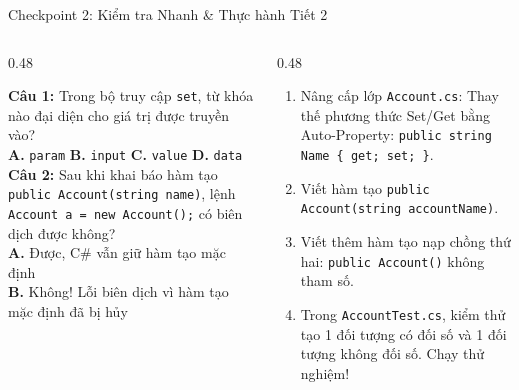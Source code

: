 \documentclass[aspectratio=169, 10pt]{beamer}
\begin{document}
\begin{frame}{Checkpoint 2: Kiểm tra Nhanh \& Thực hành Tiết 2}
  \begin{columns}[T]
    \begin{column}{0.48\textwidth}
      \begin{tcolorbox}[colback=UniOrange!10,colframe=UniOrange,title=\textbf{Quiz Checkpoint 2},fonttitle=\small\bfseries]
        \small \textbf{Câu 1:} Trong bộ truy cập \texttt{set}, từ khóa nào đại diện cho giá trị được truyền vào?\\
        \textbf{A.} \texttt{param} \quad \textbf{B.} \texttt{input} \quad \textbf{C.} \texttt{value} \checkmark \quad \textbf{D.} \texttt{data}\\
        \vspace{2mm}
        \textbf{Câu 2:} Sau khi khai báo hàm tạo \texttt{public Account(string name)}, lệnh \texttt{Account a = new Account();} có biên dịch được không?\\
        \textbf{A.} Được, C\# vẫn giữ hàm tạo mặc định\\
        \textbf{B.} Không! Lỗi biên dịch vì hàm tạo mặc định đã bị hủy \checkmark
      \end{tcolorbox}
    \end{column}

    \begin{column}{0.48\textwidth}
      \begin{tcolorbox}[colback=UniGreen!10,colframe=UniGreen,title=\textbf{Hands-on Lab 2 (15 Phút)},fonttitle=\small\bfseries]
        \begin{enumerate}\small
          \item Nâng cấp lớp \texttt{Account.cs}: Thay thế phương thức Set/Get bằng Auto-Property: \texttt{public string Name \{ get; set; \}}.
          \item Viết hàm tạo \texttt{public Account(string accountName)}.
          \item Viết thêm hàm tạo nạp chồng thứ hai: \texttt{public Account()} không tham số.
          \item Trong \texttt{AccountTest.cs}, kiểm thử tạo 1 đối tượng có đối số và 1 đối tượng không đối số. Chạy thử nghiệm!
        \end{enumerate}
      \end{tcolorbox}
    \end{column}
  \end{columns}
\end{frame}
\end{document}
